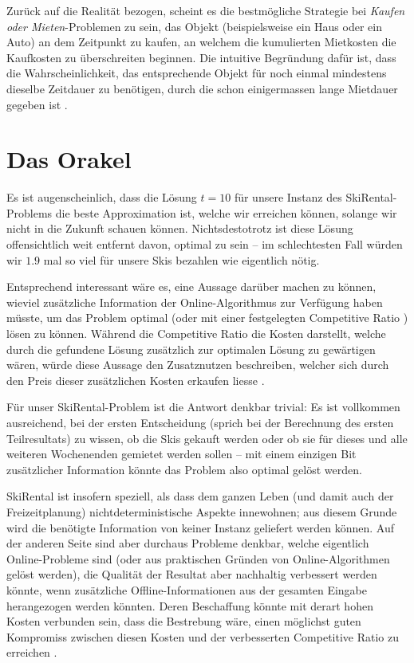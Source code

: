 \documentclass[11pt,abstracton]{scrreprt} %
\theoremstyle{definition}
\begin{document}
\bigskip
Zurück auf die Realität bezogen, scheint es die bestmögliche Strategie bei {\sl Kaufen oder Mieten}-Problemen zu sein, das Objekt (beispielsweise ein Haus oder ein Auto) an dem Zeitpunkt zu kaufen, an welchem die kumulierten Mietkosten die Kaufkosten zu überschreiten beginnen. Die intuitive Begründung dafür ist, dass die Wahrscheinlichkeit, das entsprechende Objekt für noch einmal mindestens dieselbe Zeitdauer zu benötigen, durch die schon einigermassen lange Mietdauer gegeben ist \cite{Trevisan}.


\section{Das Orakel}

Es ist augenscheinlich, dass die Lösung $t = 10$ für unsere Instanz des {\sc SkiRental}-Problems die beste Approximation ist, welche wir erreichen können, solange wir nicht in die Zukunft schauen können. Nichtsdestotrotz ist diese Lösung offensichtlich weit entfernt davon, optimal zu sein -- im schlechtesten Fall würden wir $1.9$ mal so viel für unsere Skis bezahlen wie eigentlich nötig.

\bigskip
Entsprechend interessant wäre es, eine Aussage darüber machen zu können, wieviel zusätzliche Information der Online-Algorithmus zur Verfügung haben müsste, um das Problem optimal (oder mit einer festgelegten Competitive Ratio \cite{BKK}) lösen zu können. Während die Competitive Ratio die Kosten darstellt, welche durch die gefundene Lösung zusätzlich zur optimalen Lösung zu gewärtigen wären, würde diese Aussage den Zusatznutzen beschreiben, welcher sich durch den Preis dieser zusätzlichen Kosten erkaufen liesse \cite{Dobrev}.

\bigskip
Für unser {\sc SkiRental}-Problem ist die Antwort denkbar trivial: Es ist vollkommen ausreichend, bei der ersten Entscheidung (sprich bei der Berechnung des ersten Teilresultats) zu wissen, ob die Skis gekauft werden  oder ob sie für dieses und alle weiteren Wochenenden gemietet werden sollen -- mit einem einzigen Bit zusätzlicher Information könnte das Problem also optimal gelöst werden.

\bigskip
{\sc SkiRental} ist insofern speziell, als dass dem ganzen Leben (und damit auch der Freizeitplanung) nichtdeterministische Aspekte innewohnen; aus diesem Grunde wird die benötigte Information von keiner Instanz geliefert werden können. Auf der anderen Seite sind aber durchaus Probleme denkbar, welche eigentlich Online-Probleme sind (oder aus praktischen Gründen von Online-Algorithmen gelöst werden), die Qualität der Resultat aber nachhaltig verbessert werden könnte, wenn zusätzliche Offline-Informationen aus der gesamten Eingabe herangezogen werden könnten. Deren Beschaffung könnte mit derart hohen Kosten verbunden sein, dass die Bestrebung wäre, einen möglichst guten Kompromiss zwischen diesen Kosten und der verbesserten Competitive Ratio zu erreichen \cite{Dobrev}.
\end{document}
